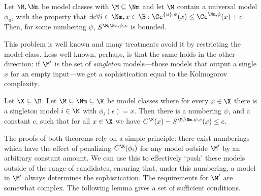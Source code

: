 \begin{theorem}[Underfitting]
Let $\M, \Nm$ be model classes with $\M \subseteq \Nm$ and let $\M$ contain a universal model $\phi_u$, with the property that $\exists c \forall i \in \Nm, x \in \B : \Cc^{\{u\},\phi}(x) \leq \Cc^{\Nm, \phi}(x)+ c$. Then, for some numbering $\psi$, $S^{\M,\Nm, \psi,c}$ is bounded. \label{theorem:underfitting}
\end{theorem}
This problem is well known and many treatments avoid it by restricting the model class. Less well known, perhaps, is that the same holds in the other direction:  if $\M'$ is the set of \emph{singleton} models---those models that output a single $x$ for an empty input---we get a sophistication equal to the Kolmogorov complexity.

\begin{theorem}[Overfitting]
Let $\X \subseteq \B$. Let $\M \subseteq \Nm \subseteq \K$ be model classes where for every $x\in\X$ there is a singleton model $i\in\M$ with $\phi_i(\epsilon)=x$. Then there is a numbering $\psi$, and a constant $c$, such that for all $x\in\X$ we have $C^\K(x)-S^{\M,\Nm,\psi,c}(x) \leq c$.\label{theorem:overfitting}
\end{theorem}
The proofs of both theorems rely on a simple principle: there exist numberings which have the effect of penalizing $C^\K(\phi_i)$ for any model outside $\M'$ by an arbitrary constant amount. We can use this to effectively `push' these models outside of the range of candidates, ensuring that, under this numbering, a model in $\M'$ always determines the sophistication. The requirements for $\M'$ are somewhat complex. The following lemma gives a set of sufficient conditions.

